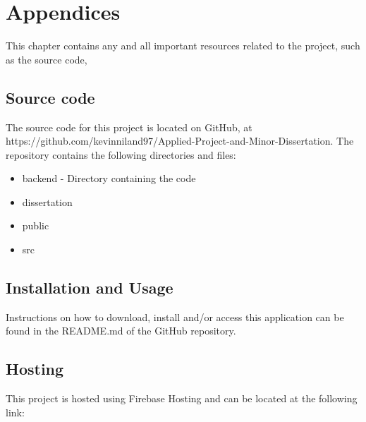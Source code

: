 \chapter{Appendices}
This chapter contains any and all important resources related to the project, such as the source code, 

\section{Source code}
The source code for this project is located on GitHub, at https://github.com/kevinniland97/Applied-Project-and-Minor-Dissertation. The repository contains the following directories and files:

\begin{itemize}
    \item backend - Directory containing the code 
    \item dissertation
    \item public
    \item src
\end{itemize}

\section{Installation and Usage}
Instructions on how to download, install and/or access this application can be found in the README.md of the GitHub repository.

\section{Hosting}
This project is hosted using Firebase Hosting and can be located at the following link: 
